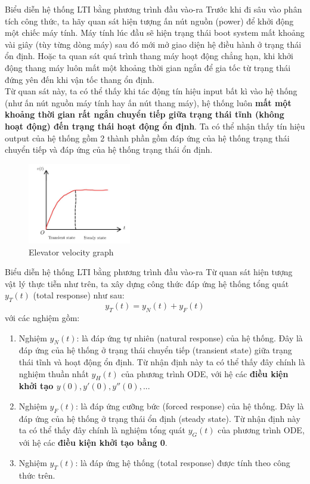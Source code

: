 \documentclass[8pt]{beamer}
\begin{document}
\begin{frame}{Biểu diễn hệ thống LTI bằng phương trình đầu vào-ra}
Trước khi đi sâu vào phân tích công thức, ta hãy quan sát hiện tượng ấn nút nguồn (power) để khởi động một chiếc máy tính. Máy tính lúc đầu sẽ hiện trạng thái boot system mất khoảng vài giây (tùy từng dòng máy) sau đó mới mở giao diện hệ điều hành ở trạng thái ổn định. Hoặc ta quan sát quá trình thang máy hoạt động chẳng hạn, khi khởi động thang máy luôn mất một khoảng thời gian ngắn để gia tốc từ trạng thái đứng yên đến khi vận tốc thang ổn định.
\\ Từ quan sát này, ta có thể thấy khi tác động tín hiệu input bất kì vào hệ thống (như ấn nút nguồn máy tính hay ấn nút thang máy), hệ thống luôn \textbf{mất một khoảng thời gian rất ngắn chuyển tiếp giữa trạng thái tĩnh (không hoạt động) đến trạng thái hoạt động ổn định}. Ta có thể nhận thấy tín hiệu output của hệ thống gồm 2 thành phần gồm \alert{đáp ứng của hệ thống trạng thái chuyển tiếp} và \alert{đáp ứng của hệ thống trạng thái ổn định}.


\begin{figure}[h]
			\includegraphics[width=0.4\textwidth]{elevator.jpg}
			\caption{Elevator velocity graph }\label{fig:re11}
		\end{figure}
\end{frame}
\begin{frame}{Biểu diễn hệ thống LTI bằng phương trình đầu vào-ra}
	Từ quan sát hiện tượng vật lý thực tiễn như trên, ta xây dựng công thức đáp ứng hệ thống tổng quát $y_{T}(t)$ (total response) như sau:
	$$y_{T}(t)=y_{N}(t)+y_{F}(t)$$
với các nghiệm gồm:
\begin{enumerate}
	\item Nghiệm $y_{N}(t)$: là đáp ứng tự nhiên (natural response) của hệ thống. Đây là đáp ứng của hệ thống ở trạng thái chuyển tiếp (transient state) giữa trạng thái tĩnh và hoạt động ổn định. Từ nhận định này ta có thể thấy đây chính là \alert{nghiệm thuần nhất $y_{H}(t)$} của phương trình ODE, với  hệ các \textbf{điều kiện khởi tạo $y(0), y'(0), y''(0),..$}.
	\item Nghiệm $y_{F}(t)$: là đáp ứng cưỡng bức (forced response) của hệ thống. Đây là đáp ứng của hệ thống ở trạng thái ổn định (steady state). Từ nhận định này ta có thể thấy đây chính là \alert{nghiệm tổng quát $y_{G}(t)$} của phương trình ODE, với hệ các \textbf{điều kiện khởi tạo bằng 0}.
	\item Nghiệm $y_{T}(t)$: là đáp ứng hệ thống (total response) được tính theo công thức trên.
\end{enumerate}
\end{frame}
\end{document}
